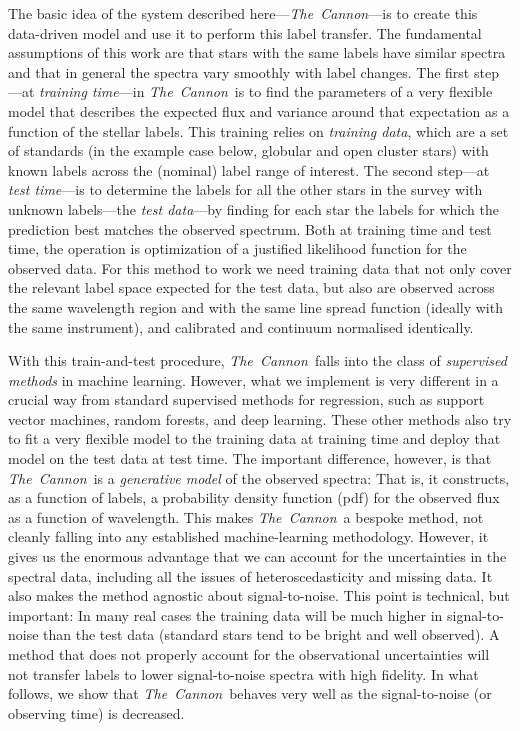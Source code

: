 \documentclass[12pt, preprint]{aastex}
\newcommand{\tc}{\textsl{The~Cannon}}
\begin{document}
The basic idea of the system described here---\tc---is to create this
data-driven model and use it to perform this label transfer.
The fundamental assumptions of this work are that stars with the same
labels have similar spectra and that in general the spectra vary
smoothly with label changes.
The first step---at \emph{training time}---in \tc\ is to find the
parameters of a very flexible model that describes the expected flux
and variance around that expectation as a function of the stellar
labels.
This training relies on \emph{training data}, which are a set of
standards (in the example case below, globular and open cluster stars)
with known labels across the (nominal) label range of interest.
The second step---at \emph{test time}---is to determine the labels for
all the other stars in the survey with unknown labels---the \emph{test
  data}---by finding for each star the labels for which the prediction
best matches the observed spectrum.
Both at training time and test time, the operation is optimization of
a justified likelihood function for the observed data.
For this method to work we need training data that not only cover the
relevant label space expected for the test data, but also are observed
across the same wavelength region and with the same line spread
function (ideally with the same instrument), and calibrated and
continuum normalised identically.

With this train-and-test procedure, \tc\ falls into the class of \emph{supervised methods} in machine learning.
However, what we implement is very different in a crucial way from standard supervised methods for regression,
such as support vector machines, random forests, and deep learning.
These other methods also try to fit a very flexible model to the training data at training time
and deploy that model on the test data at test time.
The important difference, however, is that \tc\ is a \emph{generative model} of the observed spectra:
That is, it constructs, as a function of labels,
a probability density function (pdf) for the observed flux as a function of wavelength.
This makes \tc\ a bespoke method, not cleanly falling into any established machine-learning methodology.
However, it gives us the enormous advantage that we can account for the uncertainties in the spectral data,
including all the issues of heteroscedasticity and missing data.
It also makes the method agnostic about signal-to-noise.
This point is technical, but important:
In many real cases the training data will be much higher in signal-to-noise than the test data
(standard stars tend to be bright and well observed).
A method that does not properly account for the observational uncertainties will not transfer labels to lower signal-to-noise
spectra with high fidelity.
In what follows, we show that \tc\ behaves very well as the signal-to-noise (or observing time) is decreased.
\end{document}
